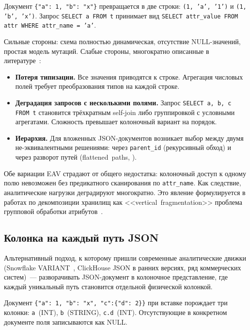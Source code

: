 Документ \texttt{\{"a":~1, "b":~"x"\}} превращается в две строки:
\texttt{(1, 'a', '1')} и \texttt{(1, 'b', 'x')}. Запрос
\texttt{SELECT a FROM t} принимает вид
\texttt{SELECT attr\_value FROM attr WHERE attr\_name~=~'a'}.

Сильные стороны: схема полностью динамическая, отсутствие
NULL-значений, простая модель мутаций. Слабые стороны, многократно
описанные в литературе~\cite{dinu2007}:

\begin{itemize}
    \item \textbf{Потеря типизации.} Все значения приводятся к
    строке. Агрегация числовых полей требует преобразования типов
    на каждой строке.
    \item \textbf{Деградация запросов с несколькими полями.} Запрос
    \texttt{SELECT a, b, c FROM t} становится трёхкратным
    self-join либо группировкой с условными агрегатами. Сложность
    превышает колоночный вариант на порядок.
    \item \textbf{Иерархия.} Для вложенных JSON-документов
    возникает выбор между двумя не-эквивалентными решениями:
    через \texttt{parent\_id} (рекурсивный обход) и через
    разворот путей (flattened~paths, \cite{beyer2005,florescu1999}).
\end{itemize}

Обе вариации EAV страдают от общего недостатка: колоночный доступ к
одному полю невозможен без предикатного сканирования по
\texttt{attr\_name}. Как следствие, аналитические нагрузки
деградируют многократно. Это явление формулируется в работах по
декомпозиции хранилищ как <<vertical~fragmentation>> проблема
групповой обработки атрибутов~\cite{copeland1985}.

\subsection{Колонка на каждый путь JSON}

Альтернативный подход, к которому пришли современные аналитические
движки (Snowflake VARIANT~\cite{snowflake-variant}, ClickHouse JSON
в ранних версиях, ряд коммерческих систем)~--- разворачивать
JSON-документ в колоночное представление, где каждый уникальный
путь становится отдельной физической колонкой.

Документ \texttt{\{"a":~1, "b":~"x", "c":\{"d":~2\}\}} при вставке
порождает три колонки: \texttt{a}~(INT), \texttt{b}~(STRING),
\texttt{c.d}~(INT). Отсутствующие в конкретном документе поля
записываются как NULL.

